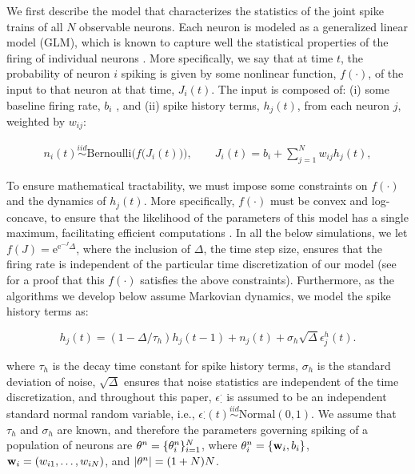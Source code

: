 We first describe the model that characterizes the statistics of the joint spike trains of all $N$ observable neurons.  Each neuron is modeled as a generalized linear model (GLM), which is known to capture well the statistical properties of the firing of individual neurons \cite{PILL07, PAN03d, Wu07, Rigat06, OKA05}.  More specifically, we say that at time $t$, the probability of neuron $i$ spiking is given by some nonlinear function, $f(\cdot)$, of the input to that neuron at that time, $J_i(t)$.  The input is composed of: (i) some baseline firing rate, $b_i$%
, and (ii) spike history terms, $h_j(t)$, from each neuron $j$, weighted by $w_{ij}$:

\begin{equation} \label{eqn:glm:definition}
\begin{array}{l}
n_i(t)\overset{iid}{\sim} \text{Bernoulli}\big(f\big(J_i(t)\big)\big), \qquad %
J_i(t)=b_i+\sum \limits_{j=1}^{N}  w_{ij} h_{j}(t), %
\end{array}
\end{equation}

\noindent To ensure mathematical tractability, we must impose some constraints on $f(\cdot)$ and the dynamics of $h_j(t)$.  More specifically, $f(\cdot)$ must be convex and log-concave, to ensure that the likelihood of the parameters of this model has a single maximum, facilitating efficient computations \cite{PAN03d}.  In all the below simulations, we let $f(J)=\text{e}^{\text{e}^{-J}\Delta}$, where the inclusion of $\Delta$, the time step size, ensures that the firing rate is independent of the particular time discretization of our model (see \cite{??} for a proof that this $f(\cdot)$ satisfies the above constraints).  Furthermore, as the algorithms we develop below assume Markovian dynamics, we model the spike history terms as:

\begin{equation} \label{eqn:h:definition}
h_j(t) = (1- \Delta/\tau_h) h_j(t-1) +n_j(t) + \sigma_h \sqrt{\Delta} \epsilon^h_j(t).
\end{equation}

\noindent where $\tau_h$ is the decay time constant for spike history terms, $\sigma_h$ is the standard deviation of noise, $\sqrt{\Delta}$ ensures that noise statistics are independent of the time discretization, and throughout this paper, $\epsilon_\cdot^\cdot$ is assumed to be an independent standard normal random variable, i.e., $\epsilon_{\cdot}^{\cdot}(t) \overset{iid}{\sim} \text{Normal}(0,1)$.  We assume that $\tau_h$ and $\sigma_h$ are known, and therefore the parameters governing spiking of a population of neurons are $\mathbf{\theta}^n=\{\mathbf{\theta}^n_i\}_{i=1}^N$, where $\mathbf{\theta}^n_i=\{\mathbf{w}_i, b_i\}$,  $\mathbf{w}_i=(w_{i1},\ldots, w_{iN})$, and $|\mathbf{\theta}^n|=(1+N) N$. 

